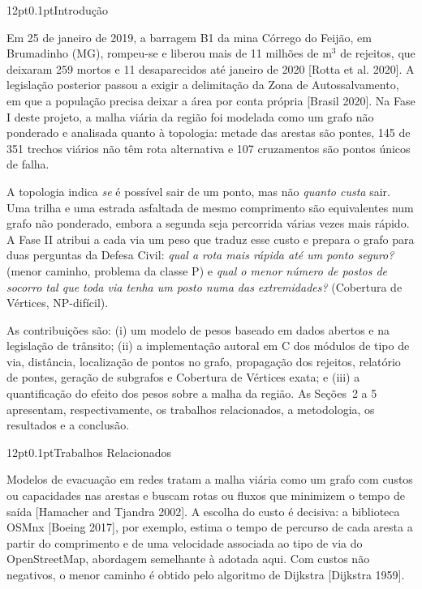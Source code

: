 \documentclass[12pt,a4paper]{article}
\makeatletter
\renewcommand\section{\@startsection{section}{1}{\z@}%
  {12pt}{0.1pt}{\normalfont\fontsize{13}{15}\selectfont\bfseries}}
\makeatother
\begin{document}
\section{Introdução}

Em 25 de janeiro de 2019, a barragem B1 da mina Córrego do Feijão, em Brumadinho (MG), rompeu-se e liberou mais de 11 milhões de m$^3$ de rejeitos, que deixaram 259 mortos e 11 desaparecidos até janeiro de 2020 [Rotta et al. 2020]. A legislação posterior passou a exigir a delimitação da Zona de Autossalvamento, em que a população precisa deixar a área por conta própria [Brasil 2020]. Na Fase I deste projeto, a malha viária da região foi modelada como um grafo não ponderado e analisada quanto à topologia: metade das arestas são pontes, 145 de 351 trechos viários não têm rota alternativa e 107 cruzamentos são pontos únicos de falha.

A topologia indica \emph{se} é possível sair de um ponto, mas não \emph{quanto custa} sair. Uma trilha e uma estrada asfaltada de mesmo comprimento são equivalentes num grafo não ponderado, embora a segunda seja percorrida várias vezes mais rápido. A Fase II atribui a cada via um peso que traduz esse custo e prepara o grafo para duas perguntas da Defesa Civil: \emph{qual a rota mais rápida até um ponto seguro?} (menor caminho, problema da classe P) e \emph{qual o menor número de postos de socorro tal que toda via tenha um posto numa das extremidades?} (Cobertura de Vértices, NP-difícil).

As contribuições são: (i) um modelo de pesos baseado em dados abertos e na legislação de trânsito; (ii) a implementação autoral em C dos módulos de tipo de via, distância, localização de pontos no grafo, propagação dos rejeitos, relatório de pontes, geração de subgrafos e Cobertura de Vértices exata; e (iii) a quantificação do efeito dos pesos sobre a malha da região. As Seções~2 a 5 apresentam, respectivamente, os trabalhos relacionados, a metodologia, os resultados e a conclusão.

\section{Trabalhos Relacionados}

Modelos de evacuação em redes tratam a malha viária como um grafo com custos ou capacidades nas arestas e buscam rotas ou fluxos que minimizem o tempo de saída [Hamacher and Tjandra 2002]. A escolha do custo é decisiva: a biblioteca OSMnx [Boeing 2017], por exemplo, estima o tempo de percurso de cada aresta a partir do comprimento e de uma velocidade associada ao tipo de via do OpenStreetMap, abordagem semelhante à adotada aqui. Com custos não negativos, o menor caminho é obtido pelo algoritmo de Dijkstra [Dijkstra 1959].
\end{document}
